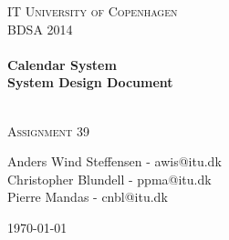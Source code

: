 


%


\begin{center}
\thispagestyle{empty}


\textsc{\LARGE IT University of Copenhagen}\\[1.5cm]

\textsc{\Large BDSA 2014 }\\[0.5cm]

\HRule \\[0.4cm]
{ \huge \bfseries Calendar System \\ System Design Document\\ [0.4cm]
    }

\HRule \\[1cm]

\textsc{\Large Assignment 39 }\\[1.5cm]

\begin{minipage}{1\textwidth}
\begin{center} \large
Anders Wind Steffensen - awis@itu.dk\\
Christopher Blundell - ppma@itu.dk\\
Pierre Mandas - cnbl@itu.dk\\
\end{center}
\end{minipage}


\vfill

{\large \today}

\end{center}

\frontmatter%

%
%


\tableofcontents
\newpage

\mainmatter%









